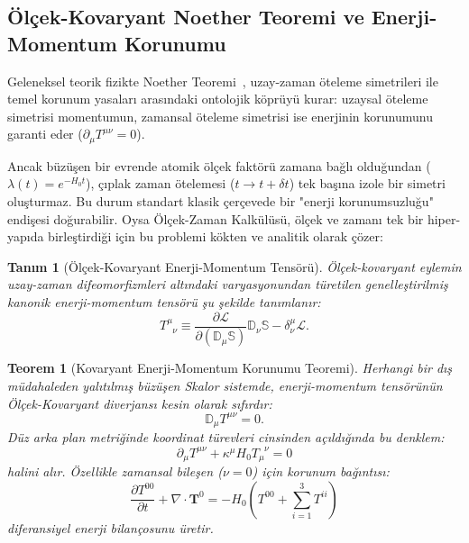 \documentclass[11pt,a4paper]{article}
\newtheorem{theorem}{Teorem}[section]
\newtheorem{definition}{Tanım}[section]
\begin{document}
\subsection{Ölçek-Kovaryant Noether Teoremi ve Enerji-Momentum Korunumu}
\label{sec:noether_ve_enerji}

Geleneksel teorik fizikte Noether Teoremi~\cite{noether1918}, uzay-zaman öteleme simetrileri ile temel korunum yasaları arasındaki ontolojik köprüyü kurar: uzaysal öteleme simetrisi momentumun, zamansal öteleme simetrisi ise enerjinin korunumunu garanti eder ($\partial_\mu T^{\mu\nu} = 0$).

Ancak büzüşen bir evrende atomik ölçek faktörü zamana bağlı olduğundan ($\lambda(t) = e^{-H_0 t}$), çıplak zaman ötelemesi ($t \to t + \delta t$) tek başına izole bir simetri oluşturmaz. Bu durum standart klasik çerçevede bir "enerji korunumsuzluğu" endişesi doğurabilir. Oysa Ölçek-Zaman Kalkülüsü, ölçek ve zamanı tek bir hiper-yapıda birleştirdiği için bu problemi kökten ve analitik olarak çözer:

\begin{definition}[Ölçek-Kovaryant Enerji-Momentum Tensörü]
    \label{def:olcek_enerji_momentum_tensoru_sc}
    Ölçek-kovaryant eylemin uzay-zaman difeomorfizmleri altındaki varyasyonundan türetilen genelleştirilmiş kanonik enerji-momentum tensörü şu şekilde tanımlanır:
    \begin{equation}
        T^\mu_{\phantom{\mu}\nu} \equiv \frac{\partial \mathcal{L}}{\partial (\mathbb{D}_\mu \mathbb{S})} \mathbb{D}_\nu \mathbb{S} - \delta^\mu_\nu \mathcal{L}.
        \label{eq:olcek_enerji_momentum_tensoru}
    \end{equation}
\end{definition}

\begin{theorem}[Kovaryant Enerji-Momentum Korunumu Teoremi]
    \label{thm:kovaryant_korunum_sc}
    Herhangi bir dış müdahaleden yalıtılmış büzüşen Skalor sistemde, enerji-momentum tensörünün Ölçek-Kovaryant diverjansı kesin olarak sıfırdır:
    \begin{equation}
        \mathbb{D}_\mu T^{\mu\nu} = 0.
        \label{eq:kovaryant_korunum}
    \end{equation}
    Düz arka plan metriğinde koordinat türevleri cinsinden açıldığında bu denklem:
    \begin{equation}
        \partial_\mu T^{\mu\nu} + \kappa^\mu H_0 T_{\mu}^{\phantom{\mu}\nu} = 0
    \end{equation}
    halini alır. Özellikle zamansal bileşen ($\nu = 0$) için korunum bağıntısı:
    \begin{equation}
        \frac{\partial T^{00}}{\partial t} + \nabla \cdot \mathbf{T}^{0} = - H_0 \left( T^{00} + \sum_{i=1}^3 T^{ii} \right)
        \label{eq:enerji_bilancosu}
    \end{equation}
    diferansiyel enerji bilançosunu üretir.
\end{theorem}
\end{document}
